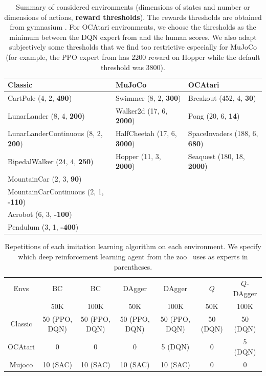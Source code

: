 \begin{table}[ht]
\centering
\small
\begin{tabular}{lll}
\hline
\textbf{Classic} & \textbf{MuJoCo} & \textbf{OCAtari}\\
\hline
CartPole (4, 2, \textbf{490}) & Swimmer (8, 2, \textbf{300}) & Breakout (452, 4, \textbf{30})\\
LunarLander (8, 4, \textbf{200}) & Walker2d (17, 6, \textbf{2000}) & Pong (20, 6, \textbf{14})\\
LunarLanderContinuous (8, 2, \textbf{200}) & HalfCheetah (17, 6, \textbf{3000}) & SpaceInvaders (188, 6, \textbf{680})\\
BipedalWalker (24, 4, \textbf{250}) & Hopper (11, 3, \textbf{2000}) & Seaquest (180, 18, \textbf{2000})\\
MountainCar (2, 3, \textbf{90}) & \\
MountainCarContinuous (2, 1, \textbf{-110}) & \\
Acrobot (6, 3, \textbf{-100}) & \\
Pendulum (3, 1, \textbf{-400}) & \\
\hline
\end{tabular}
\caption{Summary of considered environments (dimensions of states and number or dimensions of actions, \textbf{reward thresholds}). The rewards thresholds are obtained from gymnasium \cite{gymnasium}. For OCAtari environments, we choose the thresholds as the minimum between the DQN expert from \cite{zoo} and the human scores. We also adapt subjectively some thresholds that we find too restrictive especially for MuJoCo (for example, the PPO expert from \cite{zoo} has 2200 reward on Hopper while the default threshold was 3800).}
\label{tab:envs}
\end{table}

\begin{table}
    \centering
    \footnotesize
    \begin{tabular}{c|cccccc}
    \toprule
    Envs & BC & BC & DAgger & DAgger & $Q$ & $Q$-DAgger\\
     & 50K & 100K & 50K & 100K & 50K & 100K\\
    \midrule
    Classic& 50 (PPO, DQN)& 50 (PPO, DQN)& 50 (PPO, DQN)& 50 (PPO, DQN)&  50 (DQN) & 50 (DQN)\\
    OCAtari& 0 & 0 & 0 & 5 (DQN)&  0 & 5 (DQN)\\
    Mujoco& 10 (SAC)& 10 (SAC)& 10 (SAC)& 10 (SAC)&  0 & 0\\
    \bottomrule
    \end{tabular}
    \caption{Repetitions of each imitation learning algorithm on each environment. We specify which deep reinforcement learning agent from the zoo~\cite{zoo} uses as experts in parentheses.}
    \label{tab:repet-distill}
\end{table}

